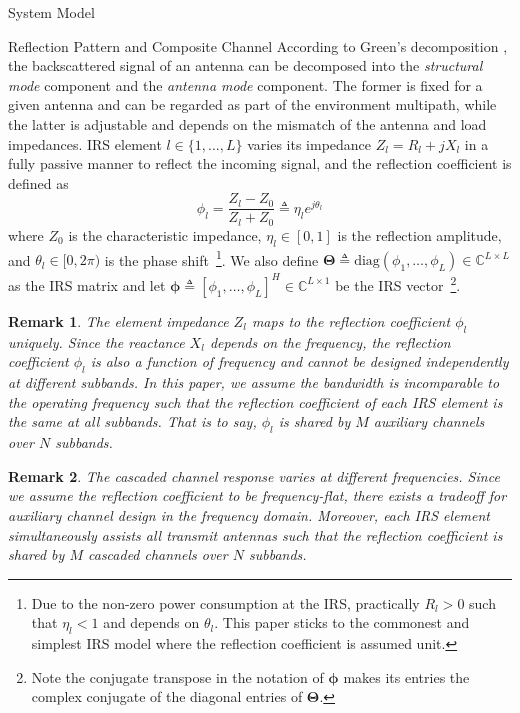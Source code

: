 \documentclass[journal]{IEEEtran}
\newtheorem{remark}{Remark}
\begin{document}
\begin{section}{System Model}
		\begin{subsection}{Reflection Pattern and Composite Channel}
			According to Green's decomposition \cite{Hansen1989}, the backscattered signal of an antenna can be decomposed into the \emph{structural mode} component and the \emph{antenna mode} component. The former is fixed for a given antenna and can be regarded as part of the environment multipath, while the latter is adjustable and depends on the mismatch of the antenna and load impedances. IRS element $l \in \{1, \dots, L\}$ varies its impedance $Z_l = R_l + j X_l$ in a fully passive manner to reflect the incoming signal, and the reflection coefficient is defined as
			\begin{equation}
				\phi_l = \frac{Z_l - Z_0}{Z_l + Z_0} \triangleq \eta_l e^{j\theta_l}
			\end{equation}
			where $Z_0$ is the characteristic impedance, $\eta_l \in [0, 1]$ is the reflection amplitude, and $\theta_l \in [0,2\pi)$ is the phase shift~\footnote{Due to the non-zero power consumption at the IRS, practically $R_l > 0$ such that $\eta_l < 1$ and depends on $\theta_l$. This paper sticks to the commonest and simplest IRS model where the reflection coefficient is assumed unit.}. We also define $\boldsymbol{\Theta} \triangleq \mathrm{diag}(\phi_1, \dots, \phi_L) \in \mathbb{C}^{L \times L}$ as the IRS matrix and let $\boldsymbol{\phi} \triangleq [\phi_1, \dots, \phi_L]^H \in \mathbb{C}^{L \times 1}$ be the IRS vector~\footnote{Note the conjugate transpose in the notation of $\boldsymbol{\phi}$ makes its entries the complex conjugate of the diagonal entries of $\boldsymbol{\Theta}$.}.

			\begin{remark}\label{re:reflection_coefficient}
				The element impedance $Z_l$ maps to the reflection coefficient $\phi_l$ uniquely. Since the reactance $X_l$ depends on the frequency, the reflection coefficient $\phi_l$ is also a function of frequency and cannot be designed independently at different subbands. In this paper, we assume the bandwidth is incomparable to the operating frequency such that the reflection coefficient of each IRS element is the same at all subbands. That is to say, $\phi_l$ is shared by $M$ auxiliary channels over $N$ subbands.
			\end{remark}

			\begin{remark}\label{re:subband_tradeoff}
				The cascaded channel response varies at different frequencies. Since we assume the reflection coefficient to be frequency-flat, there exists a tradeoff for auxiliary channel design in the frequency domain. Moreover, each IRS element simultaneously assists all transmit antennas such that the reflection coefficient is shared by $M$ cascaded channels over $N$ subbands.
			\end{remark}


\end{subsection}
\end{section}
\end{document}
